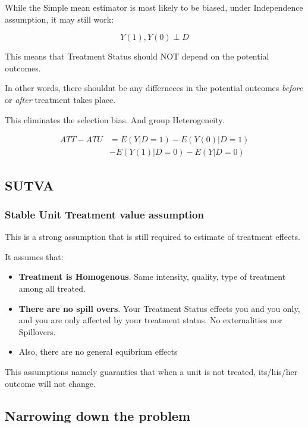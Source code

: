 \documentclass[
  letterpaper,
  DIV=11,
  numbers=noendperiod]{scrartcl}
\providecommand{\tightlist}{%
  \setlength{\itemsep}{0pt}\setlength{\parskip}{0pt}}\usepackage{longtable,booktabs,array}
\begin{document}
While the Simple mean estimator is most likely to be biased, under
Independence assumption, it may still work:

\[
Y(1),Y(0) \perp D
\]

This means that Treatment Status should NOT depend on the potential
outcomes.

In other words, there shouldnt be any differneces in the potential
outcomes \emph{before} or \emph{after} treatment takes place.

This eliminates the selection bias. And group Heterogeneity.

\[
\begin{aligned}
ATT - ATU &= E(Y|D=1) -  E(Y(0)|D=1) \\
&- E(Y(1)|D=0) -  E(Y|D=0)
\end{aligned}
\]

\hypertarget{sutva}{%
\subsection{SUTVA}\label{sutva}}

\hypertarget{stable-unit-treatment-value-assumption}{%
\subsubsection{Stable Unit Treatment value
assumption}\label{stable-unit-treatment-value-assumption}}

This is a strong assumption that is still required to estimate of
treatment effects.

It assumes that:

\begin{itemize}
\tightlist
\item
  \textbf{Treatment is Homogenous}. Same intensity, quality, type of
  treatment among all treated.
\item
  \textbf{There are no spill overs}. Your Treatment Status effects you
  and you only, and you are only affected by your treatment status. No
  externalities nor Spillovers.
\item
  Also, there are no general equibrium effects
\end{itemize}

This assumptions namely guaranties that when a unit is not treated,
its/his/her outcome will not change.

\hypertarget{narrowing-down-the-problem}{%
\subsection{Narrowing down the
problem}\label{narrowing-down-the-problem}}
\end{document}
